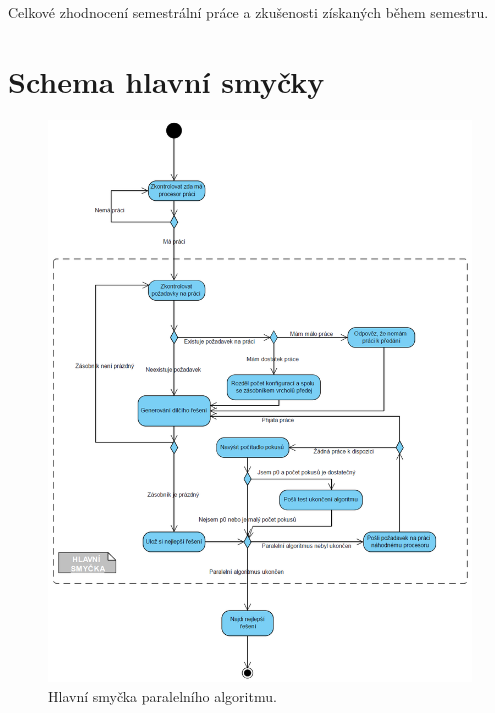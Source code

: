 \documentclass[12pt]{article}
\begin{document}
Celkové zhodnocení semestrální práce a zkušenosti získaných během semestru.




       

\appendix

\section{Schema hlavní smyčky}

\begin{figure}[ht]
\centering       
\includegraphics[scale=0.5]{while.jpg}
\caption{Hlavní smyčka paralelního algoritmu.}
\label{hlavniSmycka}
\end{figure}
\end{document}
